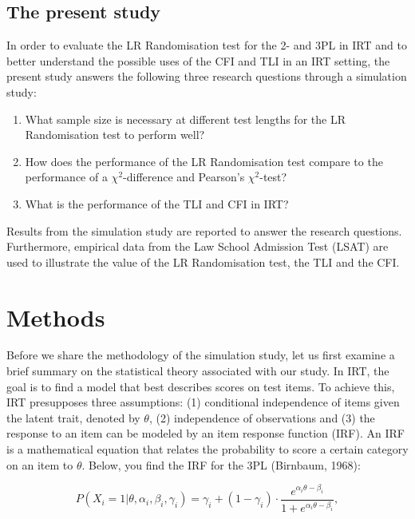 \documentclass[Royal,sageapa,times,doublespace]{sagej}
\begin{document}
\subsection{The present study}
In order to evaluate the LR Randomisation test for the 2- and 3PL in IRT and to better understand the possible uses of the CFI and TLI in an IRT setting, the present study answers the following three research questions through a simulation study:
\begin{enumerate}
\item{What sample size is necessary at different test lengths for the LR Randomisation test to perform well?}
\item{How does the performance of the LR Randomisation test compare to the performance of a $\chi^2$-difference and Pearson's $\chi^2$-test?}
\item{What is the performance of the TLI and CFI in IRT?}
\end{enumerate}
Results from the simulation study are reported to answer the research questions. Furthermore, empirical data from the Law School Admission Test (LSAT) are used to illustrate the value of the LR Randomisation test, the TLI and the CFI.

\section{Methods}
Before we share the methodology of the simulation study, let us first examine a brief summary on the statistical theory associated with our study. In IRT, the goal is to find a model that best describes scores on test items. To achieve this, IRT presupposes three assumptions: (1) conditional independence of items given the latent trait, denoted by $\theta$, (2) independence of observations and (3) the response to an item can be modeled by an item response function (IRF). An IRF is a mathematical equation that relates the probability to score a certain category on an item to $\theta$. Below, you find the IRF for the 3PL (Birnbaum, 1968):

\begin{equation}
P(X_i = 1 | \theta, \alpha_{i}, \beta_{i}, \gamma_{i}) = \gamma_{i} + (1 - \gamma_{i}) \cdot 
\frac{e^{\alpha_{i}\theta - \beta_{i}}}{1 + e^{\alpha_{i}\theta - \beta_{i}}},
\end{equation}
\end{document}
